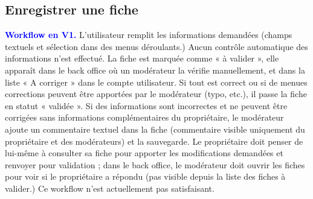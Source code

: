\documentclass[a4paper,10pt]{article}
\newcommand\existant[1]{\noindent\textbf{\textcolor{blue}{#1}}}
\begin{document}
\subsection{Enregistrer une fiche}

\existant{Workflow en V1.} L'utilisateur remplit les informations demandées (champs textuels et sélection dans des menus déroulants.) Aucun contrôle automatique des informations n'est effectué. La fiche est marquée comme « à valider », elle apparaît dans le back office où un modérateur la vérifie manuellement, et dans la liste « A corriger » dans le compte utilisateur. Si tout est correct ou si de menues corrections peuvent être apportées par le modérateur (typo, etc.), il passe la fiche en statut « validée ». Si des informations sont incorrectes et ne peuvent être corrigées sans informations complémentaires du propriétaire, le modérateur ajoute un commentaire textuel dans la fiche (commentaire visible uniquement du propriétaire et des modérateurs) et la sauvegarde. Le propriétaire doit penser de lui-même à consulter sa fiche pour apporter les modifications demandées et renvoyer pour validation ; dans le back office, le modérateur doit ouvrir les fiches pour voir si le propriétaire a répondu (pas visible depuis la liste des fiches à valider.) Ce workflow n'est actuellement pas satisfaisant.
\end{document}

